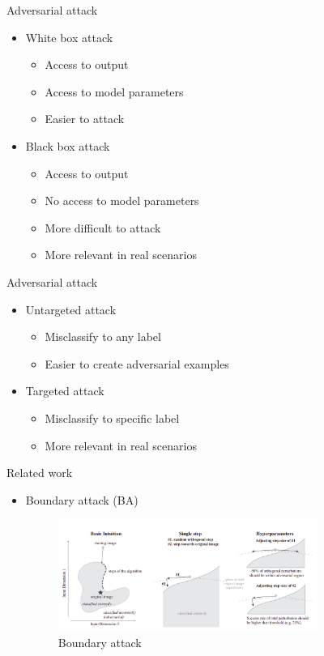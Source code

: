 \documentclass[11pt,t]{beamer}
\begin{document}
\begin{frame}{Adversarial attack}
\begin{itemize}
	\item White box attack
	\begin{itemize}
		\item Access to output
		\item Access to model parameters
		\item Easier to attack
	\end{itemize}
	\item Black box attack
	\begin{itemize}
		\item Access to output
		\item \alert{No} access to model parameters
		\item More difficult to attack
		\item More relevant in real scenarios
	\end{itemize}
\end{itemize}
\end{frame}

\begin{frame}{Adversarial attack}
\begin{itemize}
	\item Untargeted attack
	\begin{itemize}
		\item Misclassify to \alert{any} label
		\item Easier to create adversarial examples
	\end{itemize}
	\item Targeted attack
	\begin{itemize}
		\item Misclassify to \alert{specific} label
		\item More relevant in real scenarios
	\end{itemize}
\end{itemize}
\end{frame}


\begin{frame}{Related work}
\begin{itemize}
	\item Boundary attack (BA)
	\vspace{6pt}
	\begin{figure}
	\centering
	\includegraphics[width=0.8\textwidth]{graphics/boundary_attack.png}
	\caption{Boundary attack \cite{brendel2018decisionbased}\label{fig:boundary_attack}}
	\footnotesize
	\flushleft
	\end{figure}
\end{itemize}

\end{frame}
\end{document}

